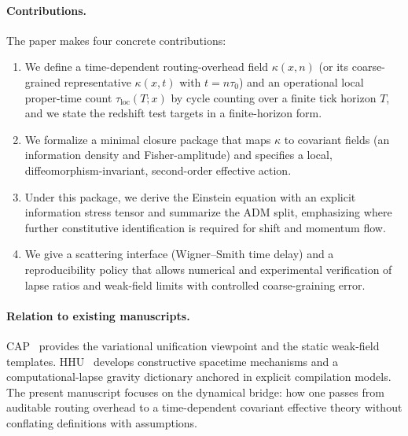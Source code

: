 \paragraph{Contributions.}
The paper makes four concrete contributions:
\begin{enumerate}
  \item We define a time-dependent routing-overhead field $\kappa(x,n)$ (or its coarse-grained representative $\kappa(x,t)$ with $t=n\tau_0$) and an operational local proper-time count $\tau_{\mathrm{loc}}(T;x)$ by cycle counting over a finite tick horizon $T$, and we state the redshift test targets in a finite-horizon form.
  \item We formalize a minimal closure package that maps $\kappa$ to covariant fields (an information density and Fisher-amplitude) and specifies a local, diffeomorphism-invariant, second-order effective action.
  \item Under this package, we derive the Einstein equation with an explicit information stress tensor and summarize the ADM split, emphasizing where further constitutive identification is required for shift and momentum flow.
  \item We give a scattering interface (Wigner--Smith time delay) and a reproducibility policy that allows numerical and experimental verification of lapse ratios and weak-field limits with controlled coarse-graining error.
\end{enumerate}

\paragraph{Relation to existing manuscripts.}
CAP~\cite{Ma2025CAP} provides the variational unification viewpoint and the static weak-field templates.
HHU~\cite{Ma2025HHU} develops constructive spacetime mechanisms and a computational-lapse gravity dictionary anchored in explicit compilation models.
The present manuscript focuses on the dynamical bridge: how one passes from auditable routing overhead to a time-dependent covariant effective theory without conflating definitions with assumptions.


